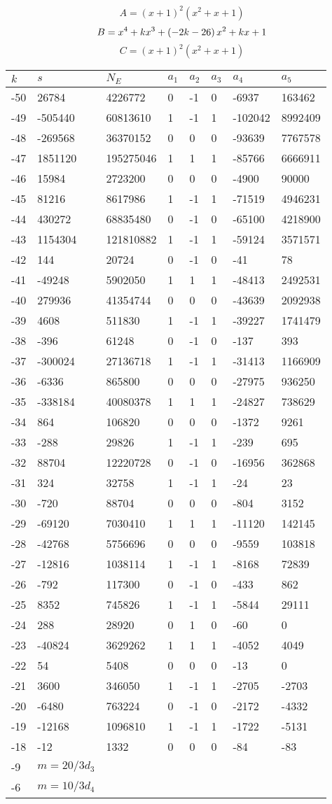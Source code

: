 \documentclass{amsart}
\begin{document}
$$A=(x
 + 1)^{2}(x^2
 + x
 + 1)$$
$$B=x^4
 + k\*x^3
 + \left(-2\*k
 - 26\right) \*x^2
 + k\*x
 + 1$$
$$C=(x
 + 1)^{2}(x^2
 + x
 + 1)$$
\begin{longtable}{|l|l|l|lllll|}
\hline
$k$ & $s$ & $N_E$ & $a_1$ & $a_2$ & $a_3$ & $a_4$ & $a_5$\\
\hline
-50&26784&4226772&0&-1&0&-6937&163462\\
-49&-505440&60813610&1&-1&1&-102042&8992409\\
-48&-269568&36370152&0&0&0&-93639&7767578\\
-47&1851120&195275046&1&1&1&-85766&6666911\\
-46&15984&2723200&0&0&0&-4900&90000\\
-45&81216&8617986&1&-1&1&-71519&4946231\\
-44&430272&68835480&0&-1&0&-65100&4218900\\
-43&1154304&121810882&1&-1&1&-59124&3571571\\
-42&144&20724&0&-1&0&-41&78\\
-41&-49248&5902050&1&1&1&-48413&2492531\\
-40&279936&41354744&0&0&0&-43639&2092938\\
-39&4608&511830&1&-1&1&-39227&1741479\\
-38&-396&61248&0&-1&0&-137&393\\
-37&-300024&27136718&1&-1&1&-31413&1166909\\
-36&-6336&865800&0&0&0&-27975&936250\\
-35&-338184&40080378&1&1&1&-24827&738629\\
-34&864&106820&0&0&0&-1372&9261\\
-33&-288&29826&1&-1&1&-239&695\\
-32&88704&12220728&0&-1&0&-16956&362868\\
-31&324&32758&1&-1&1&-24&23\\
-30&-720&88704&0&0&0&-804&3152\\
-29&-69120&7030410&1&1&1&-11120&142145\\
-28&-42768&5756696&0&0&0&-9559&103818\\
-27&-12816&1038114&1&-1&1&-8168&72839\\
-26&-792&117300&0&-1&0&-433&862\\
-25&8352&745826&1&-1&1&-5844&29111\\
-24&288&28920&0&1&0&-60&0\\
-23&-40824&3629262&1&1&1&-4052&4049\\
-22&54&5408&0&0&0&-13&0\\
-21&3600&346050&1&-1&1&-2705&-2703\\
-20&-6480&763224&0&-1&0&-2172&-4332\\
-19&-12168&1096810&1&-1&1&-1722&-5131\\
-18&-12&1332&0&0&0&-84&-83\\
-9&$m=20/3d_{3}$&&\multicolumn{5}{c|}{}\\
-6&$m=10/3d_{4}$&&\multicolumn{5}{c|}{}\\
\hline
\end{longtable}
\end{document}
